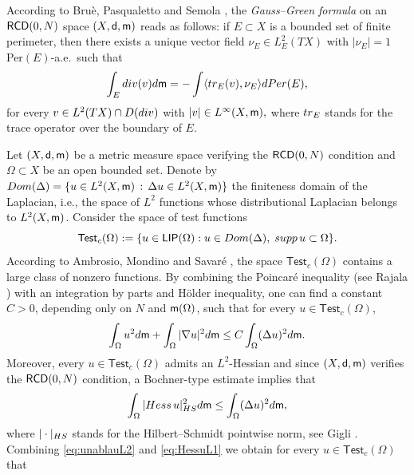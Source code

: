 \documentclass[11pt, reqno]{amsart}
\numberwithin{equation}{section}
\begin{document}
	According to Bruè,  Pasqualetto and Semola \cite{BPS}, the \textit{Gauss--Green formula} on an  ${\sf RCD}(0,N)$ space $(X,{\sf d},{\sf m})$ reads as follows: if $E\subset X$ is a bounded set of finite perimeter, then there exists a
	unique vector field $\nu_E\in L^2_E(TX)$ with $|\nu_E|=1$ Per$(E)$-a.e.\ such that 
	\begin{equation}\label{Gauss-Green}
		\int_E {\rm div}(v){\rm d}{\sf m}=-\int \langle {\rm tr}_E(v), \nu_E \rangle {\rm d}{\rm Per}(E),
	\end{equation}
	for every $v\in L^2(TX)\cap D({\rm div})$ with $|v|\in L^\infty(X,{\sf m}),$ where ${\rm tr}_E$ stands for the
	trace operator over the boundary of $E$. 
	
		
	Let $(X,{\sf d}, {\sf m})$ be a metric measure space verifying  the ${\sf RCD}(0,N)$ condition and $\Omega\subset X$ be an open bounded set. Denote by ${\rm Dom}(\Delta)= \{ u\in L^2(X,{\sf m}) \,: \, \Delta u \in L^2(X, {\sf m}) \}$ the finiteness domain of the Laplacian, i.e., the space of $L^2$ functions whose distributional Laplacian belongs to $L^2(X, {\sf m})$.  Consider the space of test functions
	$$\mathsf{Test}_c(\Omega):=\{ u\in {\sf LIP}(\Omega) : u\in {\rm Dom}(\Delta), \; {\rm supp\,} u \subset \Omega \}.$$
	According to Ambrosio,  Mondino and Savaré \cite[Lemma 6.7]{AMS}, the space $\mathsf{Test}_c(\Omega)$ contains a large class of nonzero functions. 
	By combining the Poincar\'e inequality (see Rajala \cite{Rajala}) with an integration by parts and H\"older inequality, one can find a constant $C>0$, depending only on $N$ and ${\sf m}(\Omega)$,   such that for  every   $u\in  \mathsf{Test}_c(\Omega)$,  
	\begin{equation}\label{eq:unablauL2}
		\int_\Omega  u^2 {\rm d}{\sf m}+\int_\Omega  |\nabla u|^2 {\rm d}{\sf m}
		\leq C \int_\Omega  (\Delta u)^2 {\rm d}{\sf m}. 
	\end{equation}
	Moreover, every $u\in  \mathsf{Test}_c(\Omega)$ admits an $L^2$-Hessian and since  $(X,{\sf d}, {\sf m})$ verifies the ${\sf RCD}(0,N)$ condition, a Bochner-type estimate implies that 
	\begin{equation}\label{eq:HessuL1}
		\int_\Omega |\textrm{Hess}\, u|_{\rm HS}^2 {\rm d}{\sf m} 	\leq \int_\Omega  (\Delta u)^2 {\rm d}{\sf m},
	\end{equation}
	where $|\cdot|_{\rm HS}$ stands for the Hilbert--Schmidt pointwise norm,  see Gigli \cite[Corollary 2.10]{Gigli2}. 	Combining \eqref{eq:unablauL2} and \eqref{eq:HessuL1} we  obtain  for every $u\in  \mathsf{Test}_c(\Omega)$ that
\end{document}
